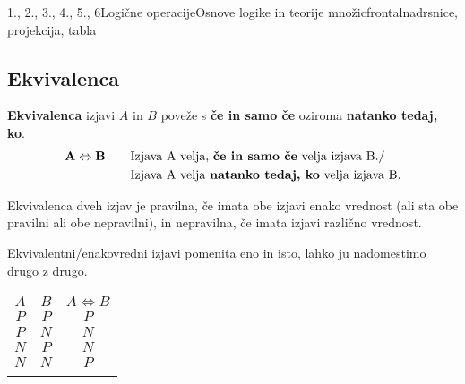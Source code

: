 \begin{priprava}{1., 2., 3., 4., 5., 6}{}{Logične operacije}{Osnove logike in teorije množic}{frontalna}{drsnice, projekcija, tabla}
~

   \subsection{Ekvivalenca}
      \textbf{Ekvivalenca} izjavi $A$ in $B$ poveže s \textbf{če in samo če} oziroma
      \textbf{natanko tedaj, ko}.
      \begin{align*} 
          \mathbf{A\Leftrightarrow B} \quad \quad &\textmd{Izjava A velja, \textbf{če in
          samo če} velja izjava B.} / \\
              &\textmd{Izjava A velja \textbf{natanko tedaj, ko} velja izjava B.}
      \end{align*}
   


            
              Ekvivalenca dveh izjav je pravilna, če imata obe izjavi enako vrednost 
              (ali sta obe pravilni ali obe nepravilni), in nepravilna, če imata izjavi
              različno vrednost.
           
            
              Ekvivalentni/enakovredni izjavi pomenita eno in isto, lahko ju nadomestimo 
              drugo z drugo.
           

          \begin{table}[H]
              \centering
              \begin{tabular}{||c|c|c||} 
              \hhline{|t:===:t|}
              \rowcolor[rgb]{0.843,0.718,0.718} $A$ & $B$ & $A\Leftrightarrow B$  \\ 
              \hhline{|:===:|}
              $P$ & $P$ & $P$                         \\ 
              \hline
              $P$ & $N$ & $N$                         \\ 
              \hline
              $N$ & $P$ & $N$                         \\ 
              \hline
              $N$ & $N$ & $P$                         \\
              \hhline{|b:===:b|}
              \end{tabular}
          \end{table}


~


\end{priprava}
